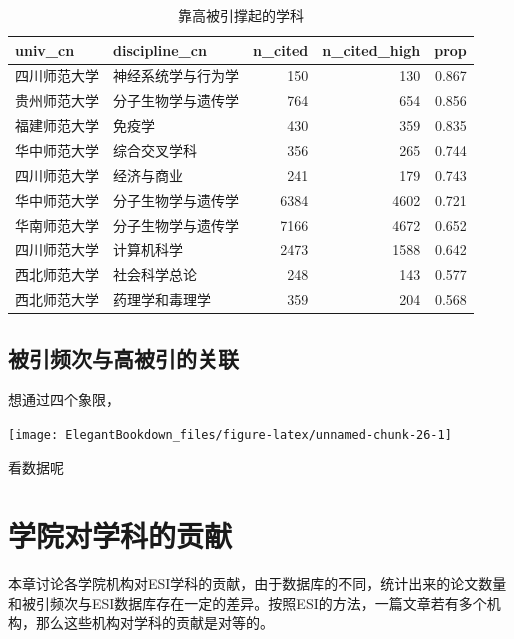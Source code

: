 \documentclass[cn, 11pt, fancy, hide]{elegantbook}
\begin{document}
\begin{table}[!h]

\caption{\label{tab:unnamed-chunk-25}靠高被引撑起的学科}
\centering
\begin{tabular}[t]{llrrr}
\toprule
univ\_cn & discipline\_cn & n\_cited & n\_cited\_high & prop\\
\midrule
四川师范大学 & 神经系统学与行为学 & 150 & 130 & 0.867\\
贵州师范大学 & 分子生物学与遗传学 & 764 & 654 & 0.856\\
福建师范大学 & 免疫学 & 430 & 359 & 0.835\\
华中师范大学 & 综合交叉学科 & 356 & 265 & 0.744\\
四川师范大学 & 经济与商业 & 241 & 179 & 0.743\\
\addlinespace
华中师范大学 & 分子生物学与遗传学 & 6384 & 4602 & 0.721\\
华南师范大学 & 分子生物学与遗传学 & 7166 & 4672 & 0.652\\
四川师范大学 & 计算机科学 & 2473 & 1588 & 0.642\\
西北师范大学 & 社会科学总论 & 248 & 143 & 0.577\\
西北师范大学 & 药理学和毒理学 & 359 & 204 & 0.568\\
\bottomrule
\end{tabular}
\end{table}

\hypertarget{ux88abux5f15ux9891ux6b21ux4e0eux9ad8ux88abux5f15ux7684ux5173ux8054}{%
\section{被引频次与高被引的关联}\label{ux88abux5f15ux9891ux6b21ux4e0eux9ad8ux88abux5f15ux7684ux5173ux8054}}

想通过四个象限，

\begin{center}\texttt{[image: ElegantBookdown\_files/figure-latex/unnamed-chunk-26-1]} \end{center}

看数据呢

\hypertarget{collegecontr}{%
\chapter{学院对学科的贡献}\label{collegecontr}}

本章讨论各学院机构对ESI学科的贡献，由于数据库的不同，统计出来的论文数量和被引频次与ESI数据库存在一定的差异。按照ESI的方法，一篇文章若有多个机构，那么这些机构对学科的贡献是对等的。
\end{document}
